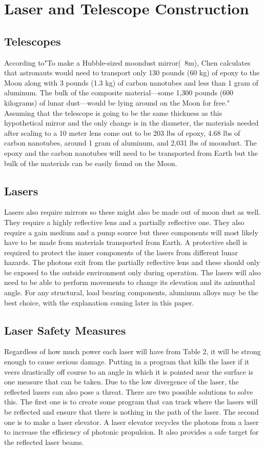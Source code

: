 \documentclass{aa}
\begin{document}
\section {Laser and Telescope Construction}
\subsection {Telescopes}
According to"To make a Hubble-sized moondust mirror(~8m), Chen calculates that astronauts would need to transport only 130 pounds (60 kg) of epoxy to the Moon along with 3 pounds (1.3 kg) of carbon nanotubes and less than 1 gram of aluminum. The bulk of the composite material—some 1,300 pounds (600 kilograms) of lunar dust—would be lying around on the Moon for free." Assuming that the telescope is going to be the same thickness as this hypothetical mirror and the only change is in the diameter, the materials needed after scaling to a 10 meter lens come out to be 203 lbs of epoxy, 4.68 lbs of carbon nanotubes, around 1 gram of aluminum, and 2,031 lbs of moondust. The epoxy and the carbon nanotubes will need to be transported from Earth but the bulk of the materials can be easily found on the Moon. 
\subsection {Lasers}
Lasers also require mirrors so these might also be made out of moon dust as well. They require a highly reflective lens and a partially reflective one. They also require a gain medium and a pump source but these components will most likely have to be made from materials transported from Earth. A protective shell is required to protect the inner components of the lasers from different lunar hazards. The photons exit from the partially reflective lens and these should only be exposed to the outside environment only during operation. The lasers will also need to be able to perform movements to change its elevation and its azimuthal angle. For any structural, load bearing components, aluminum alloys may be the best choice, with the explanation coming later in this paper.
\subsection {Laser Safety Measures}
Regardless of how much power each laser will have from Table 2, it will be strong enough to cause serious damage. Putting in a program that kills the laser if it veers drastically off course to an angle in which it is pointed near the surface is one measure that can be taken. Due to the low divergence of the laser, the reflected lasers can also pose a threat. There are two possible solutions to solve this. The first one is to create some program that can track where the lasers will be reflected and ensure that there is nothing in the path of the laser. The second one is to make a laser elevator. A laser elevator recycles the photons from a laser to increase the efficiency of photonic propulsion. It also provides a safe target for the reflected laser beams.
\end{document}
